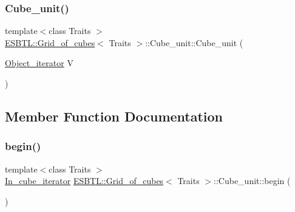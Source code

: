 \subsubsection{\texorpdfstring{Cube\+\_\+unit()}{Cube\_unit()}}
{\footnotesize\ttfamily template$<$class Traits $>$ \\
\hyperlink{structESBTL_1_1Grid__of__cubes}{E\+S\+B\+T\+L\+::\+Grid\+\_\+of\+\_\+cubes}$<$ Traits $>$\+::Cube\+\_\+unit\+::\+Cube\+\_\+unit (\begin{DoxyParamCaption}\item[{\hyperlink{structESBTL_1_1Grid__of__cubes_ae77665f05d6c7ae05c3d2d764df99193}{Object\+\_\+iterator}}]{V }\end{DoxyParamCaption})\hspace{0.3cm}{\ttfamily [inline]}}



\subsection{Member Function Documentation}
\mbox{\label{structESBTL_1_1Grid__of__cubes_1_1Cube__unit_aa97b50cdb4ec996c77c8f1ba52b63f4d}} 
\subsubsection{\texorpdfstring{begin()}{begin()}}
{\footnotesize\ttfamily template$<$class Traits $>$ \\
\hyperlink{structESBTL_1_1Grid__of__cubes_1_1Cube__unit_a9a5e21b8376bdeb122987e83f89b3c06}{In\+\_\+cube\+\_\+iterator} \hyperlink{structESBTL_1_1Grid__of__cubes}{E\+S\+B\+T\+L\+::\+Grid\+\_\+of\+\_\+cubes}$<$ Traits $>$\+::Cube\+\_\+unit\+::begin (\begin{DoxyParamCaption}{ }\end{DoxyParamCaption})\hspace{0.3cm}{\ttfamily [inline]}}

\mbox{\label{structESBTL_1_1Grid__of__cubes_1_1Cube__unit_a9a28638e4c24c8338ee60b68f5d0508b}} 
